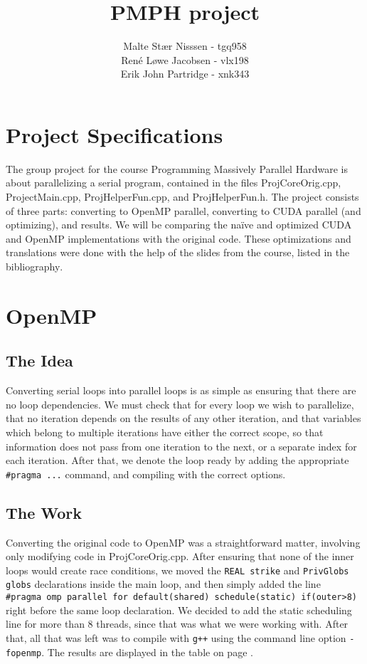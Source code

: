 \documentclass[12pt, oneside]{article}
\title{PMPH project}
\author{Malte Stær Nisssen - tgq958 \\René Løwe Jacobsen - vlx198 \\ Erik John Partridge - xnk343}
\begin{document}
	\maketitle
\section{Project Specifications}
The group project for the course Programming Massively Parallel Hardware is about parallelizing a serial program, contained in the files ProjCoreOrig.cpp, ProjectMain.cpp, ProjHelperFun.cpp, and ProjHelperFun.h. The project consists of three parts: converting to OpenMP parallel, converting to CUDA parallel (and optimizing), and results. We will be comparing the na\"ive and optimized CUDA and OpenMP implementations with the original code. These optimizations and translations were done with the help of the slides from the course, listed in the bibliography\textsuperscript{\cite{l5slides}\cite{flattening}\cite{projectslides}}.
\section{OpenMP}
\subsection{The Idea}
Converting serial loops into parallel loops is as simple as ensuring that there are no loop dependencies. We must check that for every loop we wish to parallelize, that no iteration depends on the results of any other iteration, and that variables which belong to multiple iterations have either the correct scope, so that information does not pass from one iteration to the next, or a separate index for each iteration. After that, we denote the loop ready by adding the appropriate \texttt{\#pragma ...} command, and compiling with the correct options.
\subsection{The Work}
Converting the original code to OpenMP was a straightforward matter, involving only modifying code in ProjCoreOrig.cpp. After ensuring that none of the inner loops would create race conditions, we moved the \texttt{REAL strike} and \texttt{PrivGlobs globs} declarations inside the main loop, and then simply added the line\\
\texttt{\#pragma omp parallel for default(shared) schedule(static) if(outer>8)} right before the same loop declaration. We decided to add the static scheduling line for more than 8 threads, since that was what we were working with. After that, all that was left was to compile with \texttt{g++} using the command line option \texttt{-fopenmp}. The results are displayed in the table on page \pageref{fig:results}.
\end{document}
